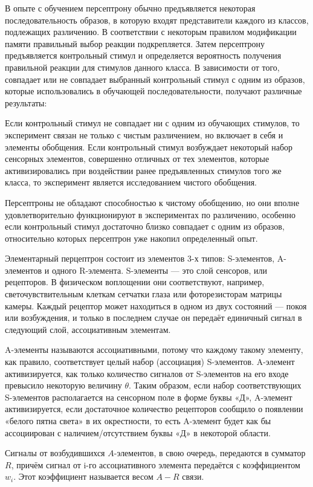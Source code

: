 В опыте с обучением персептрону обычно предъявляется некоторая последовательность образов, в которую входят представители каждого из классов, подлежащих различению. В соответствии с некоторым правилом модификации памяти правильный выбор реакции подкрепляется. Затем персептрону предъявляется контрольный стимул и определяется вероятность получения правильной реакции для стимулов данного класса. В зависимости от того, совпадает или не совпадает выбранный контрольный стимул с одним из образов, которые использовались в обучающей последовательности, получают различные результаты:

Если контрольный стимул не совпадает ни с одним из обучающих стимулов, то эксперимент связан не только с чистым различением, но включает в себя и элементы обобщения.
Если контрольный стимул возбуждает некоторый набор сенсорных элементов, совершенно отличных от тех элементов, которые активизировались при воздействии ранее предъявленных стимулов того же класса, то эксперимент является исследованием чистого обобщения.

Персептроны не обладают способностью к чистому обобщению, но они вполне удовлетворительно функционируют в экспериментах по различению, особенно если контрольный стимул достаточно близко совпадает с одним из образов, относительно которых персептрон уже накопил определенный опыт.

Элементарный перцептрон состоит из элементов 3-х типов: S-элементов, A-элементов и одного R-элемента. S-элементы — это слой сенсоров, или рецепторов. В физическом воплощении они соответствуют, например, светочувствительным клеткам сетчатки глаза или фоторезисторам матрицы камеры. Каждый рецептор может находиться в одном из двух состояний — покоя или возбуждения, и только в последнем случае он передаёт единичный сигнал в следующий слой, ассоциативным элементам.

A-элементы называются ассоциативными, потому что каждому такому элементу, как правило, соответствует целый набор (ассоциация) S-элементов. A-элемент активизируется, как только количество сигналов от S-элементов на его входе превысило некоторую величину $\theta$. Таким образом, если набор соответствующих S-элементов располагается на сенсорном поле в форме буквы «Д», A-элемент активизируется, если достаточное количество рецепторов сообщило о появлении «белого пятна света» в их окрестности, то есть A-элемент будет как бы ассоциирован с наличием/отсутствием буквы «Д» в некоторой области.

Сигналы от возбудившихся $A$-элементов, в свою очередь, передаются в сумматор $R$, причём сигнал от i-го ассоциативного элемента передаётся с коэффициентом $w_{i}$. Этот коэффициент называется весом $A-R$ связи.

